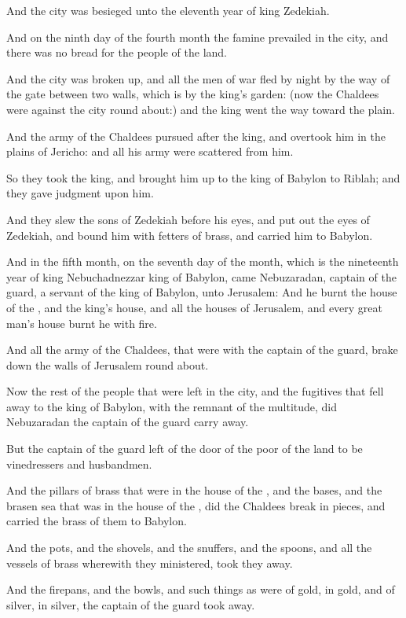 \Verse And the city was besieged unto the eleventh year of king Zedekiah.

\Verse And on the ninth day of the fourth month the famine prevailed in the city, and there was no bread for the people of the land.

\Verse And the city was broken up, and all the men of war fled by night by the way of the gate between two walls, which is by the king's garden: (now the Chaldees were against the city round about:) and the king went the way toward the plain.

\Verse And the army of the Chaldees pursued after the king, and overtook him in the plains of Jericho: and all his army were scattered from him.

\Verse So they took the king, and brought him up to the king of Babylon to Riblah; and they gave judgment upon him.

\Verse And they slew the sons of Zedekiah before his eyes, and put out the eyes of Zedekiah, and bound him with fetters of brass, and carried him to Babylon.

\Verse And in the fifth month, on the seventh day of the month, which is the nineteenth year of king Nebuchadnezzar king of Babylon, came Nebuzaradan, captain of the guard, a servant of the king of Babylon, unto Jerusalem: \Verse And he burnt the house of the \LORD, and the king's house, and all the houses of Jerusalem, and every great man's house burnt he with fire.

\Verse And all the army of the Chaldees, that were with the captain of the guard, brake down the walls of Jerusalem round about.

\Verse Now the rest of the people that were left in the city, and the fugitives that fell away to the king of Babylon, with the remnant of the multitude, did Nebuzaradan the captain of the guard carry away.

\Verse But the captain of the guard left of the door of the poor of the land to be vinedressers and husbandmen.

\Verse And the pillars of brass that were in the house of the \LORD, and the bases, and the brasen sea that was in the house of the \LORD, did the Chaldees break in pieces, and carried the brass of them to Babylon.

\Verse And the pots, and the shovels, and the snuffers, and the spoons, and all the vessels of brass wherewith they ministered, took they away.

\Verse And the firepans, and the bowls, and such things as were of gold, in gold, and of silver, in silver, the captain of the guard took away.

